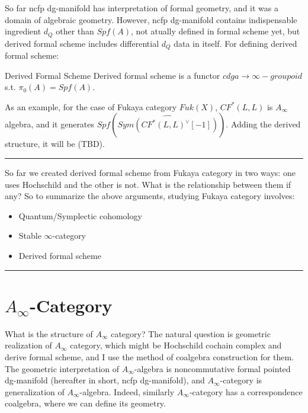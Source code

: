 \documentclass{article}
\begin{document}
\noindent
So far ncfp dg-manifold has interpretation of formal geometry, and it was a domain of algebraic geometry.
However, ncfp dg-manifold contains indispensable ingredient $d_Q$ other than $Spf(A)$, not atually defined in formal scheme yet,
but derived formal scheme includes differential $d_Q$ data in itself. For defining derived formal scheme: \\


\begin{definition}{Derived Formal Scheme}{}
Derived formal scheme is a functor $cdga \to \infty-groupoid$ s.t. $\pi_0 (A) = Spf(A)$.
\end{definition}


\noindent
As an example, for the case of Fukaya category $Fuk(X)$, $CF^*(L,L)$ is $A_\infty$ algebra, 
and it generates $Spf(\hat{Sym( CF^*(L,L)^\vee[-1])})$. Adding the derived structure, it will be (TBD). \\



\vspace{0.5cm}
\noindent\rule{\textwidth}{0.4pt}
\vspace{0.5cm}


So far we created derived formal scheme from Fukaya category in two ways: one uses Hochschild and the other is not.
What is the relationship between them if any?
So to summarize the above arguments, studying Fukaya category involves:

\begin{itemize}
\item Quantum/Symplectic cohomology
\item Stable $\infty$-category
\item Derived formal scheme
\end{itemize}



\vspace{0.5cm}
\noindent\rule{\textwidth}{0.4pt}
\vspace{0.5cm}






\tableofcontents
\vspace{1cm}



\section{$A_\infty$-Category}

What is the structure of $A_\infty$ category? The natural question is geometric realization of $A_\infty$ category,
which might be Hochschild cochain complex and derive formal scheme, and I use the method of coalgebra construction for them.
The geometric interpretation of $A_\infty$-algebra is noncommutative formal pointed dg-manifold
(hereafter in short, ncfp dg-manifold), and $A_\infty$-category is generalization of $A_\infty$-algebra.
Indeed, similarly $A_\infty$-category has a correspondence coalgebra, where we can define its geometry.
\end{document}
